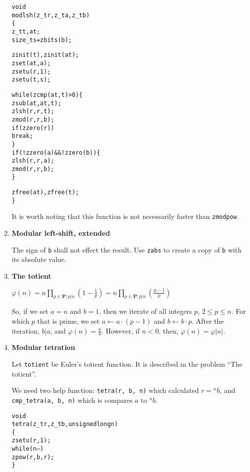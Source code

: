 \begin{enumerate}[label=\textbf{\arabic*}.]
\vspace{-1em}
\begin{alltt}
void
modlsh(z_t r, z_t a, z_t b)
\{
    z_t t, at;
    size_t s = zbits(b);

    zinit(t), zinit(at);
    zset(at, a);
    zsetu(r, 1);
    zsetu(t, s);

    while (zcmp(at, t) > 0) \{
        zsub(at, at, t);
        zlsh(r, r, t);
        zmod(r, r, b);
        if (zzero(r))
            break;
    \}
    if (!zzero(a) && !zzero(b)) \{
        zlsh(r, r, a);
        zmod(r, r, b);
    \}

    zfree(at), zfree(t);
\}
\end{alltt}
\vspace{-1em}

It is worth noting that this function is
not necessarily faster than \texttt{zmodpow}.



\item \textbf{Modular left-shift, extended}

The sign of \texttt{b} shall not effect the
result. Use \texttt{zabs} to create a copy
of \texttt{b} with its absolute value.



\item \textbf{The totient}

\( \displaystyle{
    \varphi(n)
    = n \prod_{p \in \textbf{P} : p | n} \left ( 1 - \frac{1}{p} \right )
    = n \prod_{p \in \textbf{P} : p | n} \left ( \frac{p - 1}{p} \right )
}\)

\noindent
So, if we set $a = n$ and $b = 1$, then we iterate
of all integers $p$, $2 \le p \le n$. For which $p$
that is prime, we set $a \gets a \cdot (p - 1)$ and
$b \gets b \cdot p$. After the iteration, $b | a$,
and $\varphi(n) = \frac{a}{b}$. However, if $n < 0$,
then, $\varphi(n) = \varphi|n|$.



\item \textbf{Modular tetration}

Let \texttt{totient} be Euler's totient function.
It is described in the problem ``The totient''.

We need two help function: \texttt{tetra(r, b, n)}
which calculated $r = {}^n{}b$, and \texttt{cmp\_tetra(a, b, n)}
which is compares $a$ to ${}^n{}b$.

\vspace{-1em}
\begin{alltt}
void
tetra(z_t r, z_t b, unsigned long n)
\{
    zsetu(r, 1);
    while (n--)
        zpow(r, b, r);
\}
\end{alltt}
\vspace{-1em}


\end{enumerate}
